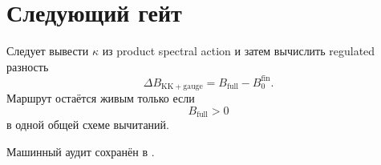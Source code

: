 \section{Следующий гейт}

Следует вывести \(\kappa\) из product spectral action и затем вычислить
regulated разность
\begin{equation}
 \Delta B_{\mathrm{KK+gauge}}
 =B_{\mathrm{full}}-B_0^{\mathrm{fin}}.
\end{equation}
Маршрут остаётся живым только если
\begin{equation}
 B_{\mathrm{full}}>0
\end{equation}
в одной общей схеме вычитаний.

Машинный аудит сохранён в
.
